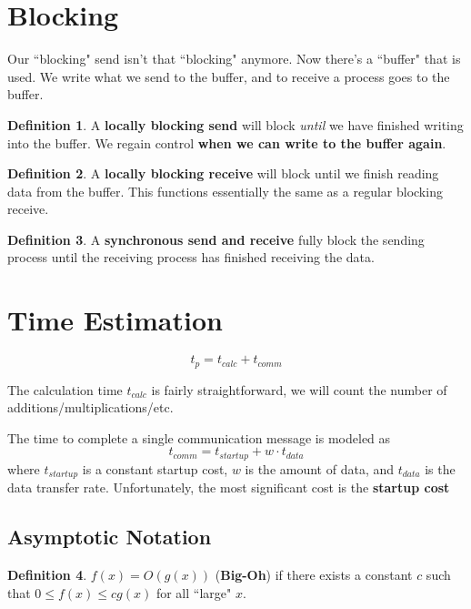 \documentclass[12pt]{article}
\numberwithin{equation}{section}
\theoremstyle{theorem}
\theoremstyle{definition}
\newtheorem{definition}{Definition}[section]
\theoremstyle{remark}
\begin{document}
\section{Blocking}
\date{March 30, 2015}
Our ``blocking" send isn't that ``blocking" anymore.  Now there's a ``buffer" that is used.  We write what we send to the buffer, and to receive a process goes to the buffer. 

\begin{definition}
A \textbf{locally blocking send} will block \textit{until} we have finished writing into the buffer.  We regain control \textbf{when we can write to the buffer again}.
\end{definition}

\begin{definition}
A \textbf{locally blocking receive} will block until we finish reading data from the buffer.  This functions essentially the same as a regular blocking receive.
\end{definition}

\begin{definition}
A \textbf{synchronous send and receive} fully block the sending process until the receiving process has finished receiving the data.
\end{definition}

\section{Time Estimation}
\begin{equation}
t_p = t_{calc} + t_{comm}
\end{equation}

The calculation time $t_{calc}$ is fairly straightforward, we will count the number of additions/multiplications/etc. 

The time to complete a single communication message is modeled as
\begin{equation}
t_{comm} = t_{startup} + w\cdot t_{data}
\end{equation}
where $t_{startup}$ is a constant startup cost, $w$ is the amount of data, and $t_{data}$ is the data transfer rate.  Unfortunately, the most significant cost is the \textbf{startup cost}

\subsection{Asymptotic Notation}
\begin{definition} $f(x) = O(g(x))$ (\textbf{Big-Oh}) if there exists a constant $c$ such that $0 \leq f(x) \leq cg(x)$ for all ``large" $x$. \end{definition}
\end{document}
